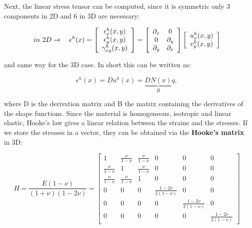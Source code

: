 	Next, the linear stress tensor can be computed, since it is symmetric only 3 components in 2D and 6 in 3D are necessary:
	
	\begin{equation}
	in \ 2D \rightarrow \quad \epsilon ^h (x) = \left[
	\begin{array}{c}
	\epsilon ^h_x(x,y)\\
	\epsilon ^h_y(x,y)\\
	\gamma ^h_{xy}(x,y)
	\end{array}
	\right]
	= \left[
	\begin{array}{cc}
	\partial _x & 0\\
	0 & \partial _y\\
	\partial _y & \partial _x
	\end{array}
	\right]
	\left[
	\begin{array}{c}
	u ^h_x(x,y)\\
	v ^h_y(x,y)\\
	\end{array}
	\right]
	\end{equation}
	
	and same way for the 3D case. In short this can be written as:
	
	\begin{equation}
	\epsilon ^h (x) = Du^h(x) = \underbrace{DN(x)}_B q,
	\end{equation}
	
	where D is the derivation matrix and B the matrix containing the derivatives of the shape functions. Since the material is homogeneous, isotropic and linear elastic, Hooke's law gives a linear relation between the strains and the stresses. If we store the stresses in a vector, they can be obtained via the \textbf{Hooke's matrix} in 3D: 
	
	\begin{equation}
	H = \frac{E(1-\nu)}{(1+\nu)(1-2\nu)} = 
	\left[
	\begin{array}{cccccc}
	1 & \frac{\nu}{1-\nu} & \frac{\nu}{1-\nu} & 0 & 0 & 0\\
	\frac{\nu}{1-\nu} & 1 & \frac{\nu}{1-\nu} & 0 & 0 & 0\\
	\frac{\nu}{1-\nu} & \frac{\nu}{1-\nu} & 1 & 0 & 0 & 0\\
	0 & 0 & 0 & \frac{1- 2\nu}{2(1-\nu)} & 0 & 0\\
	0 & 0 & 0 & 0 & \frac{1- 2\nu}{2(1-\nu)} & 0\\
	0 & 0 & 0 & 0 & 0 & \frac{1- 2\nu}{2(1-\nu)}
	\end{array}
	\right]
	\end{equation}
	
